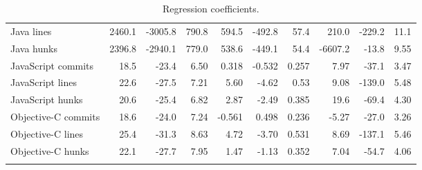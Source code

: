 \documentclass[pdflatex, sn-mathphys, referee]{sn-jnl}%
\theoremstyle{thmstyleone}%
\theoremstyle{thmstyletwo}%
\theoremstyle{thmstylethree}%
\def\tablelinesep{}
\theoremstyle{thmstyleone}
\begin{document}
\begin{table}
\begin{center}
\begin{minipage}{0.83\textwidth}
\begin{tabular*}{\textwidth}{l r r r r r r r r r }
Java lines & 2460.1 & -3005.8 & 790.8 & 594.5 & -492.8 & 57.4 & 210.0 & -229.2 & 11.1 \\
Java hunks & 2396.8 & -2940.1 & 779.0 & 538.6 & -449.1 & 54.4 & -6607.2 & -13.8 & 9.55 \\
JavaScript commits & 18.5 & -23.4 & 6.50 & 0.318 & -0.532 & 0.257 & 7.97 & -37.1 & 3.47 \\
JavaScript lines & 22.6 & -27.5 & 7.21 & 5.60 & -4.62 & 0.53 & 9.08 & -139.0 & 5.48 \\
JavaScript hunks & 20.6 & -25.4 & 6.82 & 2.87 & -2.49 & 0.385 & 19.6 & -69.4 & 4.30 \\ \tablelinesep
Objective-C commits & 18.6 & -24.0 & 7.24 & -0.561 & 0.498 & 0.236 & -5.27 & -27.0 & 3.26 \\
Objective-C lines & 25.4 & -31.3 & 8.63 & 4.72 & -3.70 & 0.531 & 8.69 & -137.1 & 5.46 \\
Objective-C hunks & 22.1 & -27.7 & 7.95 & 1.47 & -1.13 & 0.352 & 7.04 & -54.7 & 4.06 \\ \tablelinesep
\botrule
\end{tabular*}
\caption{\label{table:coefficients}Regression coefficients.}
\end{minipage}
\end{center}
\end{table}

\addtocounter{table}{-1}
\end{document}
